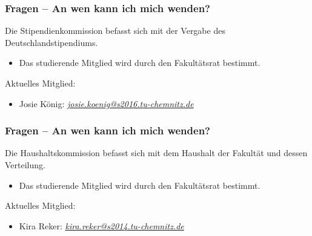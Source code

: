 \documentclass[10pt]{beamer}
\makeatletter
\newcommand{\highl}[1]{\color{tuccolor@ma}#1\color{black}}
\makeatother
\begin{document}
\begin{frame}
	\frametitle{Fragen -- An wen kann ich mich wenden?}

	\begin{block}{\vphantom{X}}
		Die Stipendienkommission befasst sich mit der Vergabe des Deutschlandstipendiums.
	\end{block}

	\begin{itemize}
		\item Das studierende Mitglied wird durch den Fakultätsrat bestimmt.
	\end{itemize}

	\vspace*{1.0cm}

	Aktuelles Mitglied:
	\begin{itemize}
		\item Josie König: \highl{\textit{\href{mailto:josie.koenig@s2016.tu-chemnitz.de}{josie.koenig@s2016.tu-chemnitz.de}}}
	\end{itemize}
\end{frame}

\begin{frame}
	\frametitle{Fragen -- An wen kann ich mich wenden?}

	\begin{block}{\vphantom{X}}
		Die Haushaltskommission befasst sich mit dem Haushalt der Fakultät und dessen Verteilung.
	\end{block}

	\begin{itemize}
		\item Das studierende Mitglied wird durch den Fakultätsrat bestimmt.
	\end{itemize}

	\vspace*{1.0cm}

	Aktuelles Mitglied:

	\begin{itemize}
		\item Kira Reker: \highl{\textit{\href{mailto:kira.reker@s2014.tu-chemnitz.de}{kira.reker@s2014.tu-chemnitz.de}}}
	\end{itemize}
\end{frame}
\end{document}
